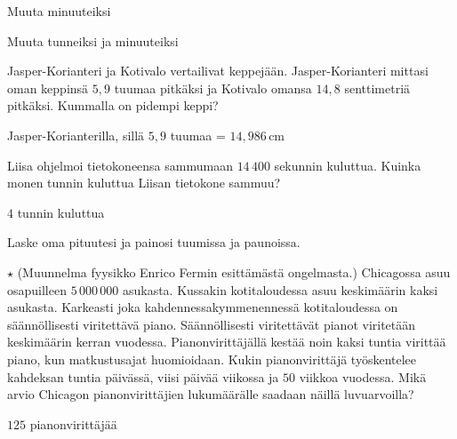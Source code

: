 \begin{tehtavasivu}
\begin{tehtava}
Muuta minuuteiksi
	\begin{vastaus}
	\end{vastaus}
\end{tehtava}

\begin{tehtava}
Muuta tunneiksi ja minuuteiksi
	\begin{vastaus}
	\end{vastaus}
\end{tehtava}

\begin{tehtava}
Jasper-Korianteri ja Kotivalo vertailivat keppejään. Jasper-Korianteri mittasi oman keppinsä $5,9$ tuumaa pitkäksi ja Kotivalo omansa $14,8$ senttimetriä pitkäksi. Kummalla on pidempi keppi?
	\begin{vastaus}
Jasper-Korianterilla, sillä $5,9$ tuumaa = $14,986$\,cm
	\end{vastaus}
\end{tehtava}

\begin{tehtava}
Liisa ohjelmoi tietokoneensa sammumaan $14\,400$ sekunnin kuluttua. Kuinka monen tunnin kuluttua Liisan tietokone sammuu?
	\begin{vastaus}
$4$ tunnin kuluttua
	\end{vastaus}
\end{tehtava}

\begin{tehtava}
Laske oma pituutesi ja painosi tuumissa ja paunoissa. %
\end{tehtava}

\begin{tehtava}
$\star$ (Muunnelma fyysikko Enrico Fermin esittämästä ongelmasta.) Chicagossa asuu osapuilleen $5\,000\,000$ asukasta. Kussakin kotitaloudessa asuu keskimäärin kaksi asukasta. Karkeasti joka kahdennessakymmenennessä kotitaloudessa on säännöllisesti viritettävä piano. Säännöllisesti viritettävät pianot viritetään keskimäärin kerran vuodessa. Pianonvirittäjällä kestää noin kaksi tuntia virittää piano, kun matkustusajat huomioidaan. Kukin pianonvirittäjä työskentelee kahdeksan tuntia päivässä, viisi päivää viikossa ja $50$ viikkoa vuodessa. Mikä arvio Chicagon pianonvirittäjien lukumäärälle saadaan näillä luvuarvoilla?
	\begin{vastaus}
$125$ pianonvirittäjää
	\end{vastaus}
\end{tehtava}

\end{tehtavasivu}